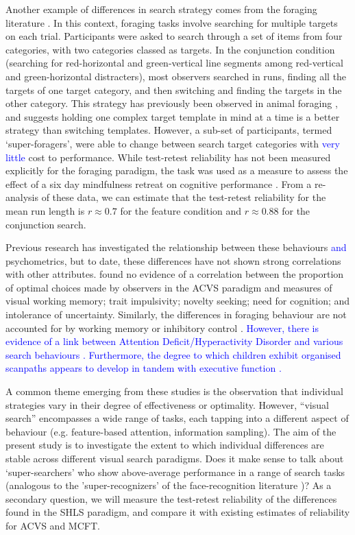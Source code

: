 \documentclass[Afour, sageapa, times]{sagej}
\begin{document}
Another example of differences in search strategy comes from the foraging literature  \cite{kristjansson2014,johannesson2016}. In this context, foraging tasks involve searching for multiple targets on each trial. Participants were asked to search through a set of items from four categories, with two categories classed as targets. In the conjunction condition (searching for red-horizontal and green-vertical line segments among red-vertical and green-horizontal distracters), most observers searched in runs, finding all the targets of one target category, and then switching and finding the targets in the other category. This strategy has previously been observed in animal foraging  \cite{dawkins1971}, and suggests holding one complex target template in mind at a time is a better strategy than switching templates. However, a sub-set of participants, termed `super-foragers', were able to change between search target categories with \textcolor{blue}{very little} cost to performance. While test-retest reliability has not been measured explicitly for the foraging paradigm, the task was used as a measure to assess the effect of a six day mindfulness retreat on cognitive performance \cite{hartkamp2017}. From a re-analysis of these data, we can estimate that the test-retest reliability for the mean run length is $r \approx 0.7$ for the feature condition and $r \approx 0.88$ for the conjunction search.  

Previous research has investigated the relationship between these behaviours \textcolor{blue}{and} psychometrics, but to date, these differences have not shown strong correlations with other attributes. \cite{irons-leber2016,irons-leber2018} found no evidence of a correlation between the proportion of optimal choices made by observers in the ACVS paradigm and measures of visual working memory; trait impulsivity; novelty seeking; need for cognition; and intolerance of uncertainty. Similarly, the differences in foraging behaviour are not accounted for by working memory or inhibitory control \cite{johannesson2017}. \textcolor{blue}{However, there is evidence of a link between Attention Deficit/Hyperactivity Disorder and various search behaviours \cite{vandendriessche2019}. Furthermore, the degree to which children exhibit organised scanpaths appears to develop in tandem with executive function \cite{woods2013}.}

A common theme emerging from these studies is the observation that individual strategies vary in their degree of effectiveness or optimality. However, ``visual search'' encompasses a wide range of tasks, each tapping into a different aspect of behaviour (e.g. feature-based attention, information sampling). The aim of the present study is to investigate the extent to which individual differences are stable across different visual search paradigms. Does it make sense to talk about `super-searchers' who show above-average performance in a range of search tasks (analogous to the 'super-recognizers' of the face-recognition literature  \cite{russell2009})? As a secondary question, we will measure the test-retest reliability of the differences found in the SHLS paradigm, and compare it with existing estimates of reliability for ACVS and MCFT. 
\end{document}
